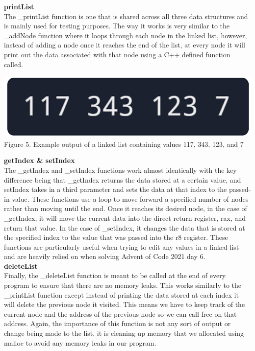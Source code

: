 \documentclass[twoside]{article}
\begin{document}
\noindent \textbf{\large printList} \\
\noindent The \_printList function is one that is shared across all three data structures and is mainly used for testing purposes. The way it works is very similar to the \_addNode function where it loops through each node in the linked list, however, instead of adding a node once it reaches the end of the list, at every node it will print out the data associated with that node using a C++ defined function called.
\begin{center}
    \includegraphics[width=.5\textwidth]{images/linkedListPrint.png}\\
    Figure 5. Example output of a linked list containing values 117, 343, 123, and 7
\end{center}

\noindent \textbf{\large getIndex \& setIndex} \\
\noindent The \_getIndex and \_setIndex functions work almost identically with the key difference being that \_getIndex returns the data stored at a certain value, and setIndex takes in a third parameter and sets the data at that index to the passed-in value. These functions use a loop to move forward a specified number of nodes rather than moving until the end. Once it reaches its desired node, in the case of \_getIndex, it will move the current data into the direct return register, rax, and return that value. In the case of \_setIndex, it changes the data that is stored at the specified index to the value that was passed into the r8 register. These functions are particularly useful when trying to edit any values in a linked list and are heavily relied on when solving Advent of Code 2021 day 6.\\

\noindent \textbf{\large deleteList} \\
\noindent Finally, the \_deleteList function is meant to be called at the end of every program to ensure that there are no memory leaks. This works similarly to the \_printList function except instead of printing the data stored at each index it will delete the previous node it visited. This means we have to keep track of the current node and the address of the previous node so we can call free on that address. Again, the importance of this function is not any sort of output or change being made to the list, it is cleaning up memory that we allocated using malloc to avoid any memory leaks in our program.\\\\
\end{document}
